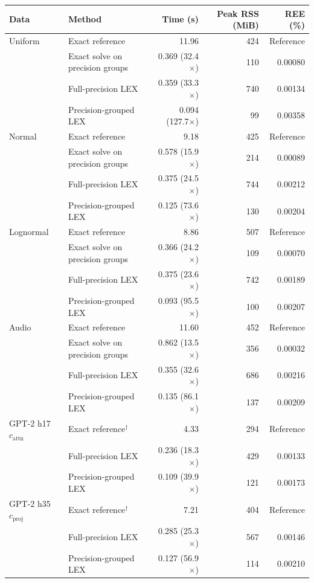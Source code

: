 \setlength{\tabcolsep}{4pt}
\begin{tabular}{@{}llrrr@{}}
\toprule
Data & Method & Time (s) & Peak RSS (MiB) & REE (\%) \\
\midrule
Uniform & Exact reference & 11.96 & 424 & Reference \\
 & Exact solve on precision groups & 0.369 (32.4$\times$) & 110 & 0.00080 \\
 & Full-precision LEX & 0.359 (33.3$\times$) & 740 & 0.00134 \\
 & Precision-grouped LEX & 0.094 (127.7$\times$) & 99 & 0.00358 \\
\addlinespace
Normal & Exact reference & 9.18 & 425 & Reference \\
 & Exact solve on precision groups & 0.578 (15.9$\times$) & 214 & 0.00089 \\
 & Full-precision LEX & 0.375 (24.5$\times$) & 744 & 0.00212 \\
 & Precision-grouped LEX & 0.125 (73.6$\times$) & 130 & 0.00204 \\
\addlinespace
Lognormal & Exact reference & 8.86 & 507 & Reference \\
 & Exact solve on precision groups & 0.366 (24.2$\times$) & 109 & 0.00070 \\
 & Full-precision LEX & 0.375 (23.6$\times$) & 742 & 0.00189 \\
 & Precision-grouped LEX & 0.093 (95.5$\times$) & 100 & 0.00207 \\
\addlinespace
Audio & Exact reference & 11.60 & 452 & Reference \\
 & Exact solve on precision groups & 0.862 (13.5$\times$) & 356 & 0.00032 \\
 & Full-precision LEX & 0.355 (32.6$\times$) & 686 & 0.00216 \\
 & Precision-grouped LEX & 0.135 (86.1$\times$) & 137 & 0.00209 \\
\midrule
GPT-2 h17 $c_{\mathrm{attn}}$ & Exact reference$^\dagger$ & 4.33 & 294 & Reference \\
 & Full-precision LEX & 0.236 (18.3$\times$) & 429 & 0.00133 \\
 & Precision-grouped LEX & 0.109 (39.9$\times$) & 121 & 0.00173 \\
\addlinespace
GPT-2 h35 $c_{\mathrm{proj}}$ & Exact reference$^\dagger$ & 7.21 & 404 & Reference \\
 & Full-precision LEX & 0.285 (25.3$\times$) & 567 & 0.00146 \\
 & Precision-grouped LEX & 0.127 (56.9$\times$) & 114 & 0.00210 \\
\bottomrule
\end{tabular}
